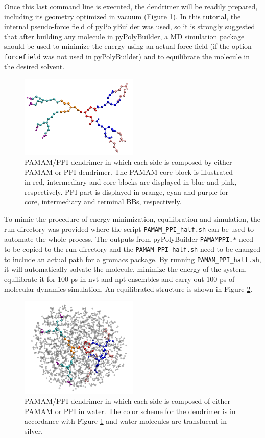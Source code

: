 Once this last command line is executed, the dendrimer will be readily prepared, including its geometry optimized in vacuum (Figure \ref{fig:HalfPPB}).
In this tutorial, the internal pseudo-force field of pyPolyBuilder was used, so it is strongly suggested that after building any molecule in pyPolyBuilder, a MD simulation package should be used to minimize the energy using an actual force field (if the option \texttt{--forcefield} was not used in pyPolyBuilder) and to equilibrate the molecule in the desired solvent.

\begin{figure}
    \centering
    \includegraphics[width=0.5\textwidth]{PAMAM_PPI-half/PAMAMPPIPPB.pdf}
    \caption{PAMAM/PPI dendrimer in which each side is composed by either PAMAM or PPI dendrimer. The PAMAM core block is illustrated in red, intermediary and core blocks are displayed in blue and pink, respectively. PPI part is displayed in orange, cyan and purple for core, intermediary and terminal BBs, respectively. }
    \label{fig:HalfPPB}
\end{figure}

To mimic the procedure of energy minimization, equilibration and simulation, the run directory was provided where the script \texttt{PAMAM\_PPI\_half.sh} can be used to automate the whole process.
The outputs from pyPolyBuilder \texttt{PAMAMPPI.*} need to be copied to the run directory and the \texttt{PAMAM\_PPI\_half.sh} need to be changed to include an actual path for a gromacs package.
By running \texttt{PAMAM\_PPI\_half.sh}, it will automatically solvate the molecule, minimize the energy of the system, equilibrate it for 100 ps in nvt and npt ensembles and carry out 100 ps of molecular dynamics simulation.
An equilibrated structure is shown in Figure \ref{fig:HalfSOL}.

\begin{figure}
    \centering
    \includegraphics[width=0.5\textwidth]{PAMAM_PPI-half/PAMAMPPISOL.pdf}
    \caption{PAMAM/PPI dendrimer in which each side is composed of either PAMAM or PPI in water. The color scheme for the dendrimer is in accordance with Figure \ref{fig:HalfPPB} and water molecules are translucent in silver.}
    \label{fig:HalfSOL}
\end{figure}
